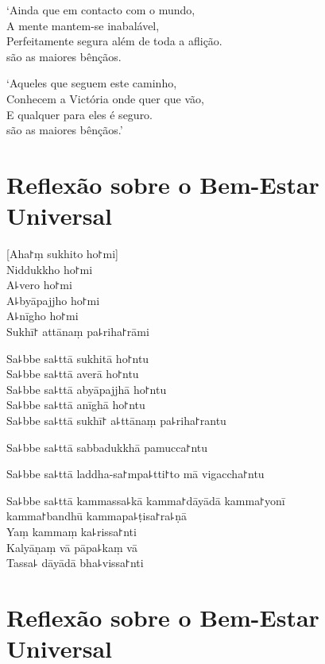 `Ainda que em contacto com o mundo,\\
A mente mantem-se inabalável,\\
Perfeitamente segura além de toda a aflição.\\
 são as maiores bênçãos.

`Aqueles que seguem este caminho,\\
Conhecem a Victória onde quer que vão,\\
E qualquer  para eles é seguro.\\
 são as maiores bênçãos.'

\chapter*[Bem-Estar Universal]{Reflexão sobre o Bem-Estar Universal}

\delegateSetUseNext


\begin{leader}
\end{leader}

[Aha꜓ṃ sukhito ho꜓mi]\\
Niddukkho ho꜓mi\\
A꜕vero ho꜓mi\\
A꜕byāpajjho ho꜓mi\\
A꜕nīgho ho꜓mi\\
Sukhī꜓ attānaṃ pa꜕riha꜓rāmi

Sa꜕bbe sa꜕ttā sukhitā ho꜓ntu\\
Sa꜕bbe sa꜕ttā averā ho꜓ntu\\
Sa꜕bbe sa꜕ttā abyāpajjhā ho꜓ntu\\
Sa꜕bbe sa꜕ttā anīghā ho꜓ntu\\
Sa꜕bbe sa꜕ttā sukhī꜓ a꜕ttānaṃ pa꜕riha꜓rantu

Sa꜕bbe sa꜕ttā sabbadukkhā pamucca꜓ntu

Sa꜕bbe sa꜕ttā laddha-sa꜓mpa꜕tti꜓to mā vigaccha꜓ntu

Sa꜕bbe sa꜕ttā kammassa꜕kā kamma꜓dāyādā kamma꜓yonī\\
\vin kamma꜓bandhū kammapa꜕ṭisa꜓ra꜕ṇā\\
Yaṃ kammaṃ ka꜕rissa꜓nti\\
Kalyāṇaṃ vā pāpa꜕kaṃ vā\\
Tassa꜕ dāyādā bha꜕vissa꜓nti

\chapter[Bem-Estar Universal]{Reflexão sobre o Bem-Estar Universal}

